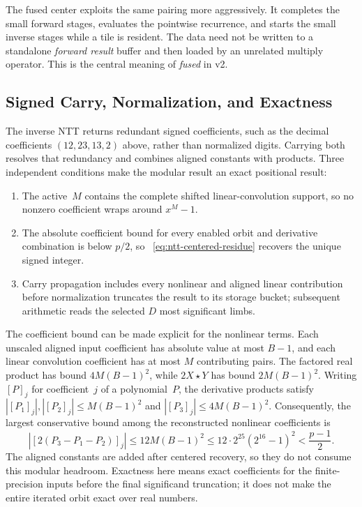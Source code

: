 The fused center exploits the same pairing more aggressively.  It completes
the small forward stages, evaluates the pointwise recurrence, and starts the
small inverse stages while a tile is resident.  The data need not be written to
a standalone \emph{forward result} buffer and then loaded by an unrelated
multiply operator.  This is the central meaning of \emph{fused} in v2.

\subsection{Signed Carry, Normalization, and Exactness}
\label{subsec:fused-ntt-carry}
\label{sec:hp-add}

The inverse NTT returns redundant signed coefficients, such as the decimal
coefficients $(12,23,13,2)$ above, rather than normalized digits.  Carrying
both resolves that redundancy and combines aligned constants with products.
Three independent conditions make the modular result an exact positional
result:

\begin{enumerate}
  \item The active~$M$ contains the complete shifted linear-convolution support,
        so no nonzero coefficient wraps around $x^M-1$.
  \item The absolute coefficient bound for every enabled orbit and derivative
        combination is below $p/2$, so
        ~\eqref{eq:ntt-centered-residue} recovers the unique signed integer.
  \item Carry propagation includes every nonlinear and aligned linear
        contribution before normalization truncates the result to its storage
        bucket; subsequent arithmetic reads the selected $D$ most significant limbs.
\end{enumerate}

The coefficient bound can be made explicit for the nonlinear terms.  Each
unscaled aligned input coefficient has absolute value at most $B-1$, and each
linear convolution coefficient has at most $M$ contributing pairs.  The factored real
product has bound $4M(B-1)^2$, while $2X\star Y$ has bound $2M(B-1)^2$.
Writing $[P]_j$ for coefficient~$j$ of a polynomial~$P$, the derivative products
satisfy $|[P_1]_j|,|[P_2]_j|\le M(B-1)^2$ and
$|[P_3]_j|\le 4M(B-1)^2$.  Consequently, the largest
conservative bound among the reconstructed nonlinear coefficients is
\begin{equation}
  |[2(P_3-P_1-P_2)]_j|
  \le 12M(B-1)^2
  \le 12\cdot 2^{25}(2^{16}-1)^2
  < \frac{p-1}{2}.
  \label{eq:reference-centered-headroom}
\end{equation}
The aligned constants are added after centered recovery, so they do not
consume this modular headroom.  Exactness here means exact coefficients for
the finite-precision inputs before the final significand truncation; it does
not make the entire iterated orbit exact over real numbers.

